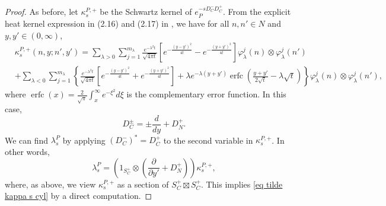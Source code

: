 \documentclass[11pt]{article}
\theoremstyle{plain}
\theoremstyle{definition}
\theoremstyle{remark}
\numberwithin{equation}{section}
\DeclareMathOperator{\erfc}{erfc}
\begin{document}
\begin{proof}
As before, let $\kappa_s^{P, +}$
be the Schwartz kernel of $e_P^{-sD_C^-D_C^+}$.
%
From the explicit heat kernel expression in (2.16) and (2.17) in \cite{APS1}, we have for all $n,n' \in N$ and $y,y' \in (0, \infty)$,
\begin{align*}
 &\kappa_s^{P, +}(n,y;n',y')=\sum_{\lambda >0} \sum_{j=1}^{m_{\lambda}}\frac{e^{-\lambda^2 t}}{\sqrt{4\pi t}}\left[ e^{-\frac{(y-y')^2}{4t}} - e^{-\frac{(y+y')^2}{4t}}\right]
 \varphi_{\lambda}^j(n) \otimes \varphi_{\lambda}^j(n')
\\
& +\sum_{\lambda<0}  \sum_{j=1}^{m_{\lambda}} \left\{
\frac{e^{-\lambda^2 t}}{\sqrt{4\pi t}}\left[ e^{-\frac{(y-y')^2}{4t}} + e^{-\frac{(y+y')^2}{4t}}\right]+\lambda e^{-\lambda(y+y')}\erfc\left(\frac{y+y'}{2\sqrt{t}}-\lambda\sqrt{t}\right)
\right\}
 \varphi_{\lambda}^j(n) \otimes \varphi_{\lambda}^j(n'),
\end{align*}
where  $\erfc(x)=\frac{2}{\sqrt{\pi}}\int_{x}^{\infty}e^{-\xi^2}d\xi$ is the complementary error function.
In this case,
\[
D_C^{\pm} = \pm \frac{d}{dy} + D_N^+.
\]
We can find   $\lambda_s^P$  by applying $(D_C^-)^* = D_C^+$ to the second variable in  $\kappa_s^{P, +}$. In other words,
\[
\lambda_s^P= \left(1_{S_C^+} \otimes \left(\frac{\partial}{\partial y'} + D_N^+ \right) \right) \kappa_s^{P, +},
\]
where, as above, we view $\kappa_s^{P, +}$ as a section of $S_C^+\boxtimes S_C^+$.
This implies \eqref{eq tilde kappa s cyl} by a direct computation.
%
%
\end{proof}
\end{document}
